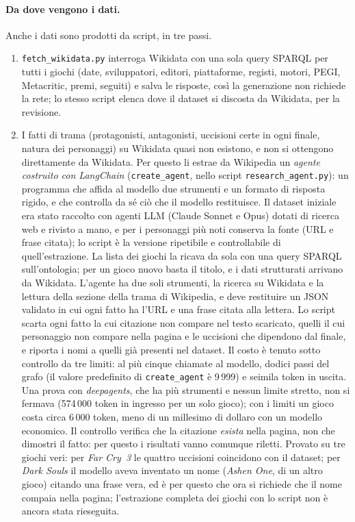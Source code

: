 \documentclass[10pt,a4paper]{article}
\begin{document}
\paragraph{Da dove vengono i dati.} Anche i dati sono prodotti da script, in tre passi.
\begin{enumerate}
  \item \texttt{fetch\_wikidata.py} interroga Wikidata con una sola query SPARQL per tutti i giochi (date, sviluppatori, editori, piattaforme, registi, motori, PEGI, Metacritic, premi, seguiti) e salva le risposte, così la generazione non richiede la rete; lo stesso script elenca dove il dataset si discosta da Wikidata, per la revisione.
  \item I fatti di trama (protagonisti, antagonisti, uccisioni certe in ogni finale, natura dei personaggi) su Wikidata quasi non esistono, e non si ottengono direttamente da Wikidata. Per questo li estrae da Wikipedia un \emph{agente costruito con LangChain} (\texttt{create\_agent}, nello script \texttt{research\_agent.py}): un programma che affida al modello due strumenti e un formato di risposta rigido, e che controlla da sé ciò che il modello restituisce. Il dataset iniziale era stato raccolto con agenti LLM (Claude Sonnet e Opus) dotati di ricerca web e rivisto a mano, e per i personaggi più noti conserva la fonte (URL e frase citata); lo script è la versione ripetibile e controllabile di quell'estrazione. La lista dei giochi la ricava da sola con una query SPARQL sull'ontologia; per un gioco nuovo basta il titolo, e i dati strutturati arrivano da Wikidata. L'agente ha due soli strumenti, la ricerca su Wikidata e la lettura della sezione della trama di Wikipedia, e deve restituire un JSON validato in cui ogni fatto ha l'URL e una frase citata alla lettera. Lo script scarta ogni fatto la cui citazione non compare nel testo scaricato, quelli il cui personaggio non compare nella pagina e le uccisioni che dipendono dal finale, e riporta i nomi a quelli già presenti nel dataset. Il costo è tenuto sotto controllo da tre limiti: al più cinque chiamate al modello, dodici passi del grafo (il valore predefinito di \texttt{create\_agent} è 9\,999) e seimila token in uscita. Una prova con \emph{deepagents}, che ha più strumenti e nessun limite stretto, non si fermava (574\,000 token in ingresso per un solo gioco); con i limiti un gioco costa circa 6\,000 token, meno di un millesimo di dollaro con un modello economico. Il controllo verifica che la citazione \emph{esista} nella pagina, non che dimostri il fatto: per questo i risultati vanno comunque riletti. Provato su tre giochi veri: per \emph{Far Cry~3} le quattro uccisioni coincidono con il dataset; per \emph{Dark Souls} il modello aveva inventato un nome (\emph{Ashen One}, di un altro gioco) citando una frase vera, ed è per questo che ora si richiede che il nome compaia nella pagina; l'estrazione completa dei \nGiochi{} giochi con lo script non è ancora stata rieseguita.

\end{enumerate}
\end{document}

